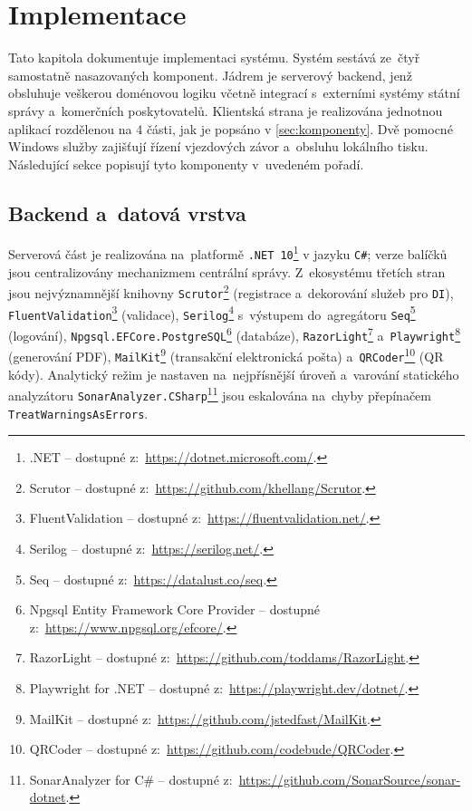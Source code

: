 \chapter{Implementace}
\label{ch:implementation}
Tato kapitola dokumentuje implementaci systému.
Systém sestává ze~čtyř samostatně nasazovaných komponent.
Jádrem je serverový backend, jenž obsluhuje veškerou doménovou logiku včetně integrací s~externími systémy státní správy a~komerčních poskytovatelů.
Klientská strana je realizována jednotnou aplikací rozdělenou na 4 části, jak je popsáno v \ref{sec:komponenty}.
Dvě pomocné Windows služby zajišťují řízení vjezdových závor a~obsluhu lokálního tisku.
Následující sekce popisují tyto komponenty v~uvedeném pořadí.

\section{Backend a~datová vrstva}
\label{sec:impl-backend}
Serverová část je realizována na~platformě \texttt{.NET~10}\footnote{.NET -- dostupné z:~\url{https://dotnet.microsoft.com/}.} v jazyku \texttt{C\#}; verze balíčků jsou centralizovány mechanizmem centrální správy.
Z~ekosystému třetích stran jsou nejvýznamnější knihovny \texttt{Scrutor}\footnote{Scrutor -- dostupné z:~\url{https://github.com/khellang/Scrutor}.} (registrace a~dekorování služeb pro \texttt{DI}), \texttt{FluentValidation}\footnote{FluentValidation -- dostupné z:~\url{https://fluentvalidation.net/}.} (validace), \texttt{Serilog}\footnote{Serilog -- dostupné z:~\url{https://serilog.net/}.} s~výstupem do~agregátoru \texttt{Seq}\footnote{Seq -- dostupné z:~\url{https://datalust.co/seq}.} (logování), \texttt{Npgsql.EFCore.PostgreSQL}\footnote{Npgsql Entity Framework Core Provider -- dostupné z:~\url{https://www.npgsql.org/efcore/}.} (databáze), \texttt{RazorLight}\footnote{RazorLight -- dostupné z:~\url{https://github.com/toddams/RazorLight}.} a~\texttt{Playwright}\footnote{Playwright for .NET -- dostupné z:~\url{https://playwright.dev/dotnet/}.} (generování PDF), \texttt{MailKit}\footnote{MailKit -- dostupné z:~\url{https://github.com/jstedfast/MailKit}.} (transakční elektronická pošta) a~\texttt{QRCoder}\footnote{QRCoder -- dostupné z:~\url{https://github.com/codebude/QRCoder}.} (QR kódy).
Analytický režim je nastaven na~nejpřísnější úroveň a~varování statického analyzátoru \texttt{SonarAnalyzer.CSharp}\footnote{SonarAnalyzer for C\# -- dostupné z:~\url{https://github.com/SonarSource/sonar-dotnet}.} jsou eskalována na~chyby přepínačem \texttt{TreatWarningsAsErrors}.

